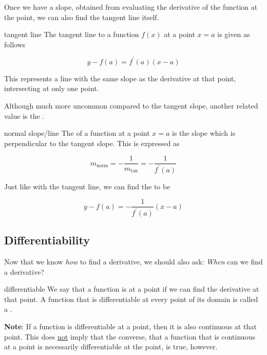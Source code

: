 Once we have a slope, obtained from evaluating the derivative of the function at the point, we can also find the tangent line itself.

\begin{definition}{tangent line}
    The tangent line to a function \( f \left( x \right) \) at a point \( x = a \) is given as follows
    
    \[ y - f \left( a \right) = f^\prime \left( a \right) \left( x - a \right) \]
    
    This represents a line with the same slope as the derivative at that point, intersecting at only one point.
\end{definition}

Although much more uncommon compared to the tangent slope, another related value is the .

\begin{definition}{normal slope/line}
    The  of a function at a point \( x = a \) is the slope which is perpendicular to the tangent slope. This is expressed as
    
    \[ m_{\text{norm}} = -\dfrac{1}{m_{\text{tan}}} = -\dfrac{1}{f^\prime \left( a \right)} \]
    
    Just like with the tangent line, we can find the  to be

    \[ y - f \left( a \right) = -\frac{1}{f^\prime \left( a \right)} \left( x - a \right) \]
\end{definition}

\subsection{Differentiability}

Now that we know \textit{how} to find a derivative, we should also ask: \textit{When} can we find a derivative?

\begin{definition}{differentiable}
    We say that a function is  at a point if we can find the derivative at that point. A function that is differentiable at every point of its domain is called a . \par
    
    \vspace{0.3cm}
    
    \textbf{Note}: If a function is differentiable at a point, then it is also continuous at that point. This does \underline{not} imply that the converse, that a function that is continuous at a point is necessarily differentiable at the point, is true, however.
\end{definition}

